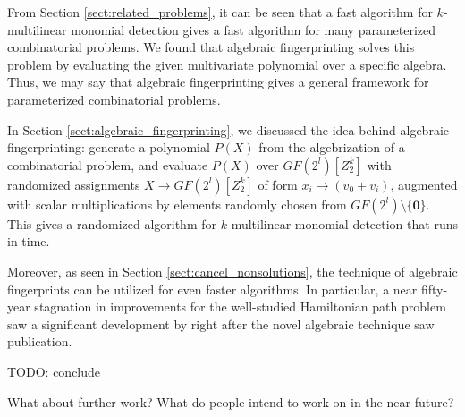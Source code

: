 From Section \ref{sect:related_problems}, 
it can be seen  
that a fast algorithm for $k$-multilinear monomial detection gives a 
fast algorithm for many parameterized combinatorial problems. 
We found that algebraic fingerprinting solves this problem by 
evaluating the given multivariate polynomial over a specific algebra. 
Thus, we 
may say that algebraic fingerprinting gives a general framework for 
parameterized combinatorial problems. 

In Section \ref{sect:algebraic_fingerprinting}, we discussed the idea behind 
algebraic fingerprinting: generate a polynomial $P(X)$ from the algebrization of 
a combinatorial problem, and evaluate $P(X)$ over $GF(2^{l})[Z_2^k]$ with 
randomized assignments $X \to GF(2^{l})[Z_2^k]$ of form 
$x_i \to (v_0 + v_i)$, augmented with scalar multiplications 
by elements randomly chosen from $GF(2^{l}) \setminus \{\mathbf{0}\}$. 
This gives a 
randomized algorithm for $k$-multilinear monomial detection that runs in  time.

Moreover, as seen in Section \ref{sect:cancel_nonsolutions}, 
the technique of algebraic fingerprints can be utilized for even 
faster algorithms. In particular, a near fifty-year stagnation 
in improvements for the well-studied Hamiltonian path problem saw 
a significant development by \citeauthor{Björklund14} right after 
the novel algebraic technique \cite{Koutis08} saw publication.

TODO: conclude

\begin{anamnote}[nomargin]{}
  What about further work?
  What do people intend to work on in the near future?
\end{anamnote}